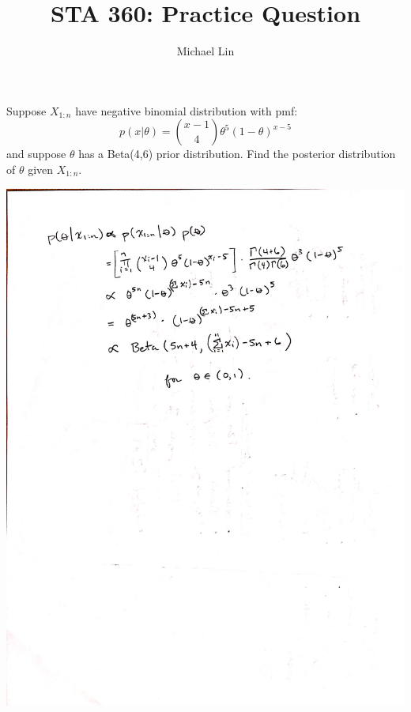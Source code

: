 \documentclass{article}
\title{STA 360: Practice Question}
\author{Michael Lin}
\begin{document}
\maketitle

Suppose $X_{1:n}$ have negative binomial distribution with pmf:
$$ p(x|\theta) = \binom{x-1}{4} \theta^5 (1-\theta)^{x-5} $$
and suppose $\theta$ has a Beta(4,6) prior distribution. Find the posterior distribution of $\theta$ given $X_{1:n}$.

\includegraphics[scale = 0.25]{practice.jpg}
\end{document}
